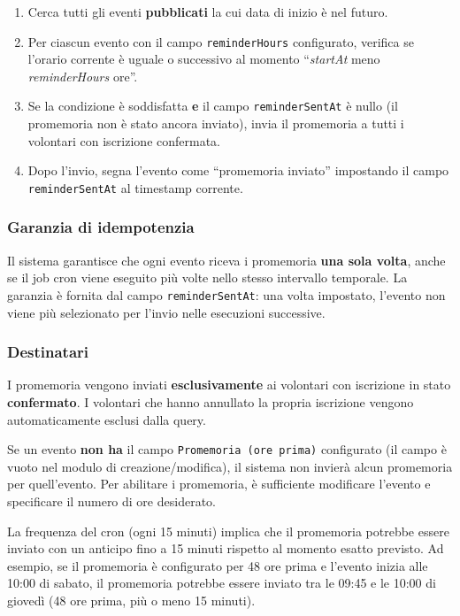 \documentclass[a4paper,11pt,oneside]{book}
\newcommand{\campo}[1]{\texttt{#1}}
\begin{document}
\begin{enumerate}[leftmargin=1.5em]
  \item Cerca tutti gli eventi \textbf{pubblicati} la cui data di inizio \`e nel futuro.
  \item Per ciascun evento con il campo \campo{reminderHours} configurato, verifica se l'orario corrente \`e uguale o successivo al momento ``\textit{startAt} meno \textit{reminderHours} ore''.
  \item Se la condizione \`e soddisfatta \textbf{e} il campo \campo{reminderSentAt} \`e nullo (il promemoria non \`e stato ancora inviato), invia il promemoria a tutti i volontari con iscrizione confermata.
  \item Dopo l'invio, segna l'evento come ``promemoria inviato'' impostando il campo \campo{reminderSentAt} al timestamp corrente.
\end{enumerate}

\subsubsection{Garanzia di idempotenzia}

Il sistema garantisce che ogni evento riceva i promemoria \textbf{una sola volta}, anche se il job cron viene eseguito pi\`u volte nello stesso intervallo temporale. La garanzia \`e fornita dal campo \campo{reminderSentAt}: una volta impostato, l'evento non viene pi\`u selezionato per l'invio nelle esecuzioni successive.

\subsubsection{Destinatari}

I promemoria vengono inviati \textbf{esclusivamente} ai volontari con iscrizione in stato \textbf{confermato}. I volontari che hanno annullato la propria iscrizione vengono automaticamente esclusi dalla query.

\begin{infobox}
Se un evento \textbf{non ha} il campo \campo{Promemoria (ore prima)} configurato (il campo \`e vuoto nel modulo di creazione/modifica), il sistema non invier\`a alcun promemoria per quell'evento. Per abilitare i promemoria, \`e sufficiente modificare l'evento e specificare il numero di ore desiderato.
\end{infobox}

\begin{warningbox}
La frequenza del cron (ogni 15 minuti) implica che il promemoria potrebbe essere inviato con un anticipo fino a 15 minuti rispetto al momento esatto previsto. Ad esempio, se il promemoria \`e configurato per 48 ore prima e l'evento inizia alle 10:00 di sabato, il promemoria potrebbe essere inviato tra le 09:45 e le 10:00 di gioved\`i (48 ore prima, pi\`u o meno 15 minuti).
\end{warningbox}
\end{document}
